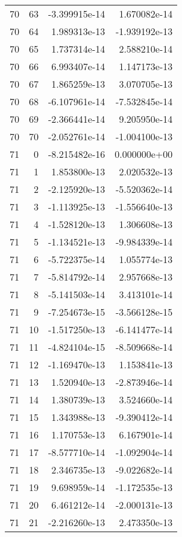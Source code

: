 \begin{tabular}{rrrr}
  70 &   63 & -3.399915e-14 &  1.670082e-14 \\
  70 &   64 &  1.989313e-13 & -1.939192e-13 \\
  70 &   65 &  1.737314e-14 &  2.588210e-14 \\
  70 &   66 &  6.993407e-14 &  1.147173e-13 \\
  70 &   67 &  1.865259e-13 &  3.070705e-13 \\
  70 &   68 & -6.107961e-14 & -7.532845e-14 \\
  70 &   69 & -2.366441e-14 &  9.205950e-14 \\
  70 &   70 & -2.052761e-14 & -1.004100e-13 \\
  71 &    0 & -8.215482e-16 &  0.000000e+00 \\
  71 &    1 &  1.853800e-13 &  2.020532e-13 \\
  71 &    2 & -2.125920e-13 & -5.520362e-14 \\
  71 &    3 & -1.113925e-13 & -1.556640e-13 \\
  71 &    4 & -1.528120e-13 &  1.306608e-13 \\
  71 &    5 & -1.134521e-13 & -9.984339e-14 \\
  71 &    6 & -5.722375e-14 &  1.055774e-13 \\
  71 &    7 & -5.814792e-14 &  2.957668e-13 \\
  71 &    8 & -5.141503e-14 &  3.413101e-14 \\
  71 &    9 & -7.254673e-15 & -3.566128e-15 \\
  71 &   10 & -1.517250e-13 & -6.141477e-14 \\
  71 &   11 & -4.824104e-15 & -8.509668e-14 \\
  71 &   12 & -1.169470e-13 &  1.153841e-13 \\
  71 &   13 &  1.520940e-13 & -2.873946e-14 \\
  71 &   14 &  1.380739e-13 &  3.524660e-14 \\
  71 &   15 &  1.343988e-13 & -9.390412e-14 \\
  71 &   16 &  1.170753e-13 &  6.167901e-14 \\
  71 &   17 & -8.577710e-14 & -1.092904e-14 \\
  71 &   18 &  2.346735e-13 & -9.022682e-14 \\
  71 &   19 &  9.698959e-14 & -1.172535e-13 \\
  71 &   20 &  6.461212e-14 & -2.000131e-13 \\
  71 &   21 & -2.216260e-13 &  2.473350e-13 \\

\end{tabular}
